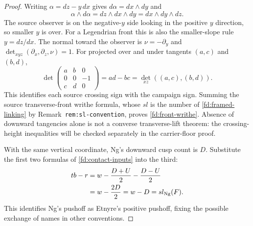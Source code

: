 \begin{proof}\leanok{}
Writing $\alpha=dz-y\,dx$ gives $d\alpha=dx\wedge dy$ and
\begin{equation}
 \alpha\wedge d\alpha=dz\wedge dx\wedge dy=dx\wedge dy\wedge dz.
\end{equation}
The source observer is on the negative-$y$ side looking in the positive
$y$ direction, so smaller $y$ is over. For a Legendrian front this is also
the smaller-slope rule $y=dz/dx$. The normal toward the observer is
$\nu=-\partial_y$ and
$\det_{xyz}(\partial_x,\partial_z,\nu)=1$.
For projected over and under tangents $(a,c)$ and $(b,d)$,
\begin{equation}
 \det\begin{pmatrix}a&b&0\\0&0&-1\\c&d&0\end{pmatrix}
 =ad-bc=\det_{xz}((a,c),(b,d)).
\end{equation}
This identifies each source crossing sign with the campaign sign.
Summing the source transverse-front writhe formula, whose $sl$ is the
number of \eqref{fd:framed-linking} by Remark~\texttt{rem:sl-convention},
proves \eqref{fd:front-writhe}. Absence of downward tangencies alone is not a
converse transverse-lift theorem: the crossing-height inequalities will be
checked separately in the carrier-floor proof.

With the same vertical coordinate, Ng's downward cusp count is $D$.
Substitute the first two formulas of \eqref{fd:contact-inputs} into the third:
\begin{align}
 tb-r&=w-\frac{D+U}{2}-\frac{D-U}{2}\notag\\
     &=w-\frac{2D}{2}=w-D=sl_{\rm Ng}(F).
\end{align}
This identifies Ng's pushoff as Etnyre's positive pushoff, fixing the
possible exchange of names in other conventions.


\end{proof}
